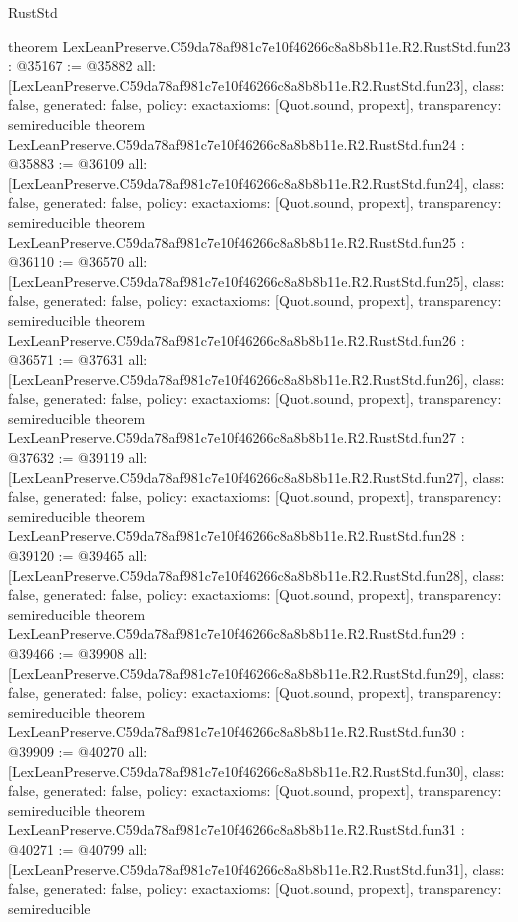 \begin{lexlean}{RustStd}
\begin{coremodule}
{}
theorem LexLeanPreserve.C59da78af981c7e10f46266c8a8b8b11e.R2.RustStd.fun23 : @35167 := @35882 {
  all: [LexLeanPreserve.C59da78af981c7e10f46266c8a8b8b11e.R2.RustStd.fun23],
  class: false,
  generated: false,
  policy: exact{axioms: [Quot.sound, propext]},
  transparency: semireducible
}
theorem LexLeanPreserve.C59da78af981c7e10f46266c8a8b8b11e.R2.RustStd.fun24 : @35883 := @36109 {
  all: [LexLeanPreserve.C59da78af981c7e10f46266c8a8b8b11e.R2.RustStd.fun24],
  class: false,
  generated: false,
  policy: exact{axioms: [Quot.sound, propext]},
  transparency: semireducible
}
theorem LexLeanPreserve.C59da78af981c7e10f46266c8a8b8b11e.R2.RustStd.fun25 : @36110 := @36570 {
  all: [LexLeanPreserve.C59da78af981c7e10f46266c8a8b8b11e.R2.RustStd.fun25],
  class: false,
  generated: false,
  policy: exact{axioms: [Quot.sound, propext]},
  transparency: semireducible
}
theorem LexLeanPreserve.C59da78af981c7e10f46266c8a8b8b11e.R2.RustStd.fun26 : @36571 := @37631 {
  all: [LexLeanPreserve.C59da78af981c7e10f46266c8a8b8b11e.R2.RustStd.fun26],
  class: false,
  generated: false,
  policy: exact{axioms: [Quot.sound, propext]},
  transparency: semireducible
}
theorem LexLeanPreserve.C59da78af981c7e10f46266c8a8b8b11e.R2.RustStd.fun27 : @37632 := @39119 {
  all: [LexLeanPreserve.C59da78af981c7e10f46266c8a8b8b11e.R2.RustStd.fun27],
  class: false,
  generated: false,
  policy: exact{axioms: [Quot.sound, propext]},
  transparency: semireducible
}
theorem LexLeanPreserve.C59da78af981c7e10f46266c8a8b8b11e.R2.RustStd.fun28 : @39120 := @39465 {
  all: [LexLeanPreserve.C59da78af981c7e10f46266c8a8b8b11e.R2.RustStd.fun28],
  class: false,
  generated: false,
  policy: exact{axioms: [Quot.sound, propext]},
  transparency: semireducible
}
theorem LexLeanPreserve.C59da78af981c7e10f46266c8a8b8b11e.R2.RustStd.fun29 : @39466 := @39908 {
  all: [LexLeanPreserve.C59da78af981c7e10f46266c8a8b8b11e.R2.RustStd.fun29],
  class: false,
  generated: false,
  policy: exact{axioms: [Quot.sound, propext]},
  transparency: semireducible
}
theorem LexLeanPreserve.C59da78af981c7e10f46266c8a8b8b11e.R2.RustStd.fun30 : @39909 := @40270 {
  all: [LexLeanPreserve.C59da78af981c7e10f46266c8a8b8b11e.R2.RustStd.fun30],
  class: false,
  generated: false,
  policy: exact{axioms: [Quot.sound, propext]},
  transparency: semireducible
}
theorem LexLeanPreserve.C59da78af981c7e10f46266c8a8b8b11e.R2.RustStd.fun31 : @40271 := @40799 {
  all: [LexLeanPreserve.C59da78af981c7e10f46266c8a8b8b11e.R2.RustStd.fun31],
  class: false,
  generated: false,
  policy: exact{axioms: [Quot.sound, propext]},
  transparency: semireducible
}
\end{coremodule}
\end{lexlean}
